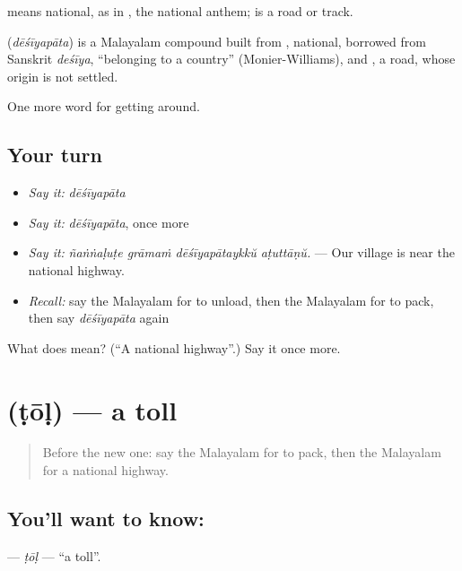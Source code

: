  means national, as in  , the national anthem;  is a road or track.

\begin{cousinweb}
\textbf{} (\emph{dēśīyapāta}) is a Malayalam compound built from , national, borrowed from Sanskrit \emph{deśīya}, \textquotedblleft{}belonging to a country\textquotedblright{} (Monier-Williams), and , a road, whose origin is not settled.
\end{cousinweb}

\begin{grammarlens}[title={What you've built}]
One more word for getting around.
\end{grammarlens}

\subsection*{Your turn}
\begin{itemize}
\raggedright
  \item \emph{Say it:} \emph{dēśīyapāta}
  \item \emph{Say it:} \emph{dēśīyapāta}, once more
  \item \emph{Say it:} \emph{ñaṅṅaḷuṭe grāmaṁ dēśīyapātaykkŭ aṭuttāṇŭ.} — Our village is near the national highway.
  \item \emph{Recall:} say the Malayalam for to unload, then the Malayalam for to pack, then say \emph{dēśīyapāta} again
\end{itemize}

\begin{tcolorbox}[breakable,colback=teal!4,colframe=teal!35!black,title={Before you move on}]
What does  mean? (\textquotedblleft{}A national highway\textquotedblright{}.) Say it once more.
\end{tcolorbox}
\section[\texorpdfstring{\ml{ടോൾ} (ṭōḷ)}{ടോൾ (ṭōḷ)}]{ (ṭōḷ) — a toll}

\label{lesson:ML-C468-tol}



\begin{quote}
Before the new one: say the Malayalam for to pack, then the Malayalam for a national highway.
\end{quote}

\subsection*{You'll want to know: }
\textbf{} — \emph{ṭōḷ} — \textquotedblleft{}a toll\textquotedblright{}.

